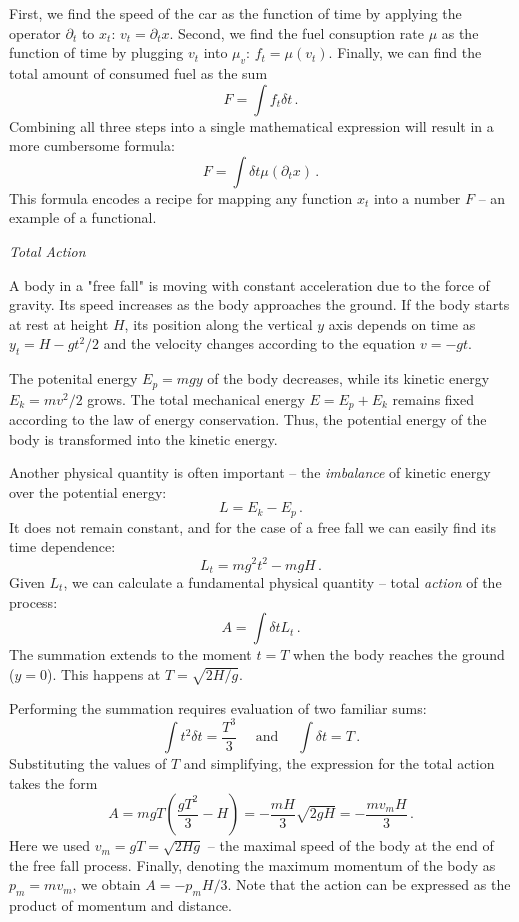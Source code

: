 First, we find the speed of the car as the function of time by applying the operator $\partial_t$ to $x_t$: $v_t=\partial_{t}x$. Second, we find the fuel consuption rate $\mu$  as the function of time by plugging $v_t$ into $\mu_v$: $f_t = \mu(v_t)$. Finally, we can find the total amount of consumed fuel as the sum
\[
F = \int f_t\delta t\,.
\]
Combining all three steps into a single mathematical expression will result in a more cumbersome formula:
\[
F = \int \delta t\mu(\partial_t x)\,.
\]
This formula encodes a recipe for mapping any function $x_t$ into a number $F$ -- an example of a functional.

\begin{flushleft}
	{\it Total Action}
\end{flushleft}
A body in a "free fall" is moving with constant acceleration due to the force of gravity. Its speed increases as the body approaches the ground. If the body starts at rest at height $H$, its position along the vertical $y$ axis depends on time as $y_t=H-gt^2/2$ and the velocity changes according to the equation $v=-gt$.

The potenital energy $E_p=mgy$ of the body decreases, while its kinetic energy $E_k=mv^2/2$ grows. The total mechanical energy $E=E_p+E_k$ remains fixed according to the law of energy conservation. Thus, the potential energy of the body is transformed into the kinetic energy.

Another physical quantity is often important -- the \emph{imbalance} of kinetic energy over the potential energy:
\[
L = E_k - E_p\,.
\]
It does not remain constant, and for the case of a free fall we can easily find its time dependence:
\[
L_t = mg^2t^2 - mgH\,.
\]
Given $L_t$, we can calculate a fundamental physical quantity -- total \emph{action} of the process:
\[
A = \int\delta t L_t\,.
\]
The summation extends to the moment $t=T$ when the body reaches the ground ($y=0$). This happens at $T=\sqrt{2H/g}$.

Performing the summation requires evaluation of two familiar sums:
\[
\int t^2\delta t =\frac{T^3}{3}\quad\textrm{ and }\quad \int \delta t=T\,.
\]
Substituting the values of $T$ and simplifying, the expression for the total action takes the form
\[
A = mgT(\frac{gT^2}{3}-H)=-\frac{mH}{3}\sqrt{2gH}=-\frac{mv_{m}H}{3}\,.
\]
Here we used $v_m=gT=\sqrt{2Hg}$ -- the maximal speed of the body at the end of the free fall process. Finally, denoting the maximum momentum of the body as $p_m=mv_m$, we obtain $A=-p_m H/3$. Note that the action can be expressed as the product of momentum and distance.

